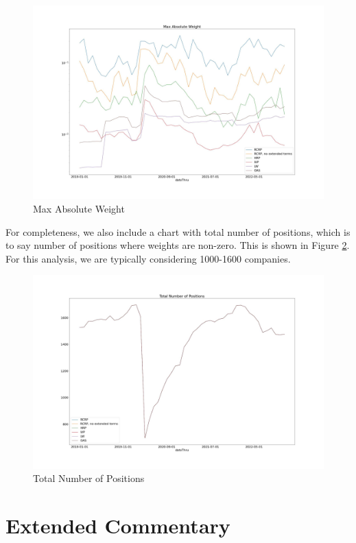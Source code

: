 \documentclass[10pt,twoside,titlepage]{article}   %
\begin{document}
\begin{figure}[!h]
\includegraphics[width = 1.00\textwidth]{image4.jpg}
\vspace{-1.75\baselineskip}
\caption{Max Absolute Weight}
\label{fig4}
\end{figure}
For completeness, we also include a chart with total number of positions, 
which is to say number of positions where weights are non-zero. 
This is shown in Figure \ref{fig5}. 
For this analysis, we are typically considering 1000-1600 companies.
\noindent
\begin{figure}[!h]
\includegraphics[width = 1.00\textwidth]{image5.jpg}
\vspace{-1.75\baselineskip}
\caption{Total Number of Positions}
\label{fig5}
\end{figure}


\section{Extended Commentary}\label{sec-Commentary}
\end{document}
